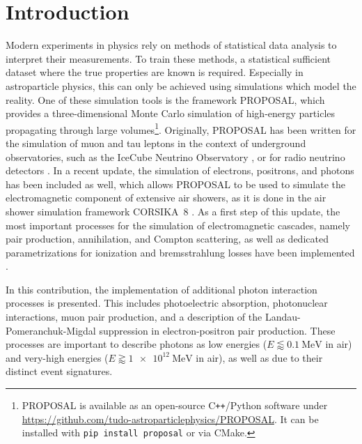 \section{Introduction}

Modern experiments in physics rely on methods of statistical data analysis to interpret their measurements.
To train these methods, a statistical sufficient dataset where the true properties are known is required.
Especially in astroparticle physics, this can only be achieved using simulations which model the reality.
One of these simulation tools is the framework PROPOSAL, which provides a three-dimensional Monte Carlo simulation of high-energy particles propagating through large volumes\footnote{PROPOSAL is available as an open-source C\texttt{++}/Python software under \url{https://github.com/tudo-astroparticlephysics/PROPOSAL}. It can be installed with \texttt{pip install proposal} or via CMake.}.
Originally, PROPOSAL has been written for the simulation of muon and tau leptons in the context of underground observatories, such as the IceCube Neutrino Observatory \cite{IceCube:2021uhz}, or for radio neutrino detectors \cite{PhysRevD.102.083011}.
In a recent update, the simulation of electrons, positrons, and photons has been included as well, which allows PROPOSAL to be used to simulate the electromagnetic component of extensive air showers, as it is done in the air shower simulation framework CORSIKA~8 \cite{icrc2023}. 
As a first step of this update, the most important processes for the simulation of electromagnetic cascades, namely pair production, annihilation, and Compton scattering, as well as dedicated parametrizations for ionization and bremsstrahlung losses have been implemented \cite{Alameddine:2021iq}.

In this contribution, the implementation of additional photon interaction processes is presented.
This includes photoelectric absorption, photonuclear interactions, muon pair production, and a description of the Landau-Pomeranchuk-Migdal suppression in electron-positron pair production.
These processes are important to describe photons as low energies ($E \lessapprox \SI{0.1}{\mega\electronvolt}$ in air) and very-high energies ($E \gtrapprox \SI{1e12}{\mega\electronvolt}$ in air), as well as due to their distinct event signatures.